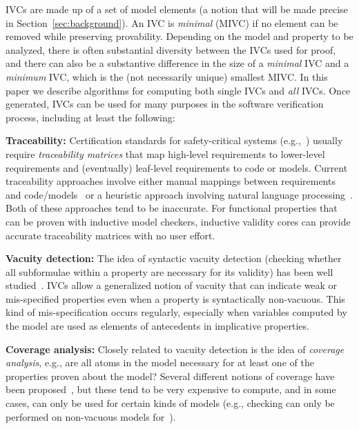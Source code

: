 

IVCs are made up of a set of model elements (a notion that will be made precise in Section~\ref{sec:background}).  An IVC is {\em minimal} (MIVC) if no element can be removed while preserving provability.  Depending on the model and property to be analyzed, there is often substantial diversity between the IVCs used for proof, and there can also be a substantive difference in the size of a {\em minimal} IVC and a {\em minimum} IVC, which is the (not necessarily unique) smallest MIVC.  In this paper we describe algorithms for computing both single IVCs and {\em all} IVCs.  Once generated, IVCs can be used for many purposes in the software verification process, including at least the following:

\noindent \textbf{Traceability:} Certification standards for safety-critical systems (e.g.,~\cite{DO178C, MOD:00-55}) usually require {\em traceability matrices} that map high-level requirements to lower-level requirements and (eventually) leaf-level requirements to code or models.  Current traceability approaches involve either manual mappings between requirements and code/models~\cite{SimulinkTraceability} or a heuristic approach involving natural language processing~\cite{Keenan12:Tracelab}.  Both of these approaches tend to be inaccurate.  For functional properties that can be proven with inductive model checkers, inductive validity cores can provide accurate traceability matrices with no user effort.

\noindent \textbf{Vacuity detection:} The idea of syntactic vacuity detection (checking whether all subformulae within a property are necessary for its validity) has been well studied~\cite{Kupferman03:Vacuity}.   IVCs allow a generalized notion of vacuity that can indicate weak or mis-specified properties even when a property is syntactically non-vacuous.   This kind of mis-specification occurs regularly, especially when variables computed by the model are used as elements of antecedents in implicative properties.

\noindent \textbf{Coverage analysis:} Closely related to vacuity detection is the idea of {\em coverage analysis}, e.g., are all atoms in the model necessary for at least one of the properties proven about the model?  Several different notions of coverage have been proposed~\cite{chockler_coverage_2003, kupferman_theory_2008}, but these tend to be very expensive to compute, and in some cases, can only be used for certain kinds of models (e.g., checking can only be performed on non-vacuous models for~\cite{kupferman_theory_2008}).

